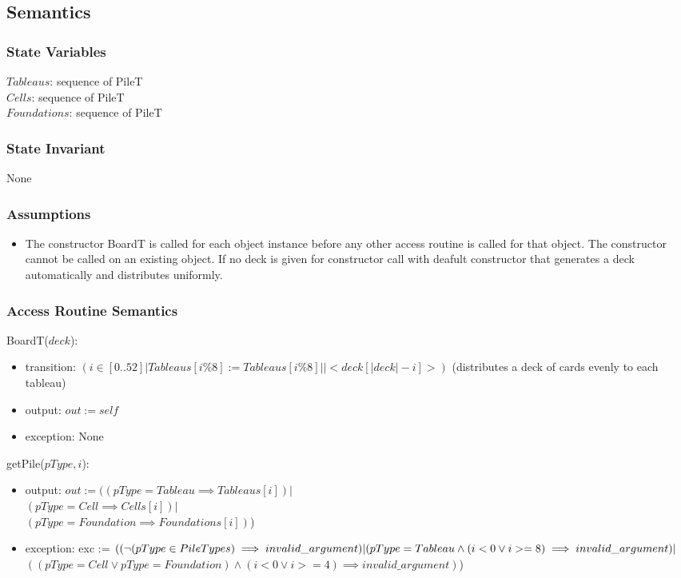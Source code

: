 \documentclass[12pt]{article}
\begin{document}
\subsection* {Semantics}

\subsubsection* {State Variables}

$Tableaus$: sequence of PileT\\
$Cells$: sequence of PileT\\
$Foundations$: sequence of PileT

\subsubsection* {State Invariant}

None

\subsubsection* {Assumptions}

\begin{itemize}
\item The constructor BoardT is called for each object instance before any other
access routine is called for that object.  The constructor cannot be called on
an existing object. If no deck is given for constructor call with deafult constructor that generates
a deck automatically and distributes uniformly.
\end{itemize}

\subsubsection* {Access Routine Semantics}

BoardT($deck$):
\begin{itemize}
\item transition: $(i \in [0..52]|Tableaus[i\%8] := Tableaus[i\%8]||<deck[|deck| - i]>)$ 
(distributes a deck of cards evenly to each tableau)
\item output: $out := \mathit{self}$
\item exception: None
\end{itemize}

\noindent getPile($pType, i$):
\begin{itemize}
\item output: $out := ((pType = Tableau \implies Tableaus[i])|$ \\
							$(pType = Cell \implies Cells[i])|$ \\
					  $(pType = Foundation \implies Foundations[i])$)\\
\item exception: exc := $((\lnot(pType \in PileTypes) \implies invalid\_argument) | \\
(pType = Tableau \land (i < 0 \lor i >= 8) \implies invalid\_argument)|$\\
$((pType = Cell \lor pType = Foundation) \land (i < 0 \lor i >= 4) \implies invalid\_argument)$)
\end{itemize}
\end{document}
